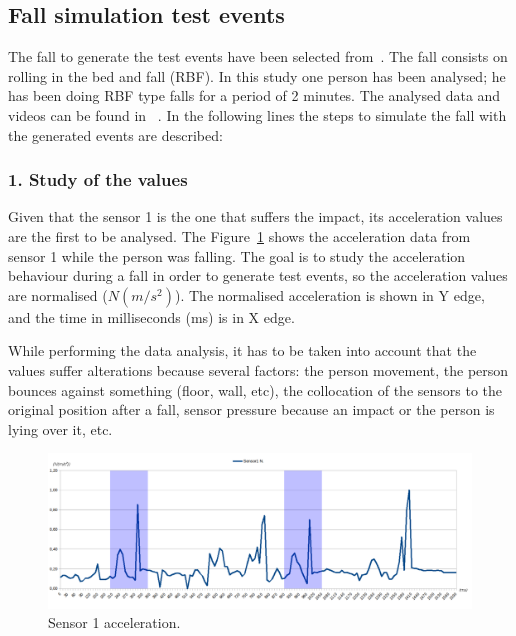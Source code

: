 \documentclass[conference]{IEEEtran}
\theoremstyle{definition}
\begin{document}
\subsection{Fall simulation test events} %

The fall to generate the test events have been selected from~\cite{Li2009,Pannurat2014}. 
The fall consists on rolling in the bed and fall (RBF). In this study one person has been 
analysed; he has been doing RBF type falls for a period of 2 minutes. The analysed 
data and videos can be found in ~\cite{}. In the following lines the steps to simulate 
the fall with the generated events are described:

\subsubsection*{1. Study of the values} Given that the sensor 1 is the one that suffers the
impact, its acceleration values are the first to be analysed. The Figure~\ref{fig:Sensor1Sombras} 
shows the acceleration data from sensor 1 while the person was falling. The goal is to study 
the acceleration behaviour during a fall in order to generate test events, so the acceleration 
values are normalised ($N(m/s^2)$). The normalised acceleration is shown in Y edge, and the 
time in milliseconds (ms) is in X edge.

While performing the data analysis, it has to be taken into account that the values suffer 
alterations because several factors: the person movement, the person bounces against something 
(floor, wall, etc), the collocation of the sensors to the original position after a fall, 
sensor pressure because an impact or the person is lying over it, etc.

 \begin{figure}[!h]
  \includegraphics[scale=0.375]{Sensor1Sombras}
  \caption[Sensor 1 acceleration]{Sensor 1 acceleration.}
  \label{fig:Sensor1Sombras}
\end{figure}
\end{document}
